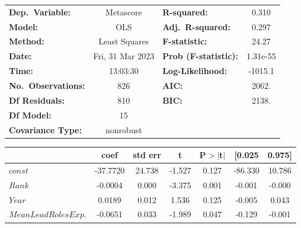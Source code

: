             \begin{center}
                \begin{tabular}{lclc}
                    \toprule
                    \textbf{Dep.~Variable:}    & Metascore        & \textbf{  R-squared:         } & 0.310    \\
                    \textbf{Model:}            & OLS              & \textbf{  Adj.~R-squared:    } & 0.297    \\
                    \textbf{Method:}           & Least Squares    & \textbf{  F-statistic:       } & 24.27    \\
                    \textbf{Date:}             & Fri, 31 Mar 2023 & \textbf{  Prob (F-statistic):} & 1.31e-55 \\
                    \textbf{Time:}             & 13:03:30         & \textbf{  Log-Likelihood:    } & -1015.1  \\
                    \textbf{No.~Observations:} & 826              & \textbf{  AIC:               } & 2062.    \\
                    \textbf{Df Residuals:}     & 810              & \textbf{  BIC:               } & 2138.    \\
                    \textbf{Df Model:}         & 15               & \textbf{                     } &          \\
                    \textbf{Covariance Type:}  & nonrobust        & \textbf{                     } &          \\
                    \bottomrule
                \end{tabular}
                \begin{tabular}{lcccccc}
                                                     & \textbf{coef} & \textbf{std err} & \textbf{t} & \textbf{P$> |$t$|$} & \textbf{[0.025} & \textbf{0.975]} \\
                    \midrule
                    \textbf{$const$}                 & -37.7720      & 24.738           & -1.527     & 0.127               & -86.330         & 10.786          \\
                    \textbf{$Rank$}                  & -0.0004       & 0.000            & -3.375     & 0.001               & -0.001          & -0.000          \\
                    \textbf{$Year$}                  & 0.0189        & 0.012            & 1.536      & 0.125               & -0.005          & 0.043           \\
                    \textbf{$Mean Lead Roles Exp.$}  & -0.0651       & 0.033            & -1.989     & 0.047               & -0.129          & -0.001          \\

\end{tabular}
\end{center}
